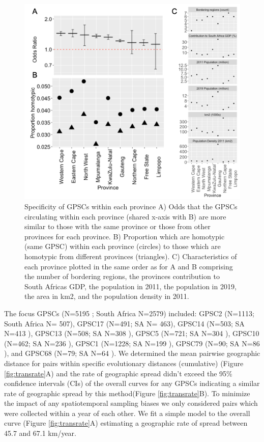 \documentclass{article}
\begin{document}
\begin{figure}[H]
\centering
    \includegraphics[width=\textwidth]{withinvsbetween.png}
    \caption{Specificity of GPSCs within each province A) Odds that the GPSCs circulating within each province (shared x-axis with B) are more similar to those with the same province or those from other provinces for each province. B) Proportion which are homotypic (same GPSC) within each province (circles) to those which are homotypic from different provinces (triangles). C) Characteristics of each province plotted in the same order as for A and B comprising the number of bordering regions, the provinces contribution to South Africas GDP, the population in 2011, the population in 2019, the area in km2, and the population density in 2011.}
      \label{fig:withinbetween}
\end{figure}
The focus GPSCs  (N=5195 ; South Africa N=2579) included: GPSC2 (N=1113; South Africa N= 507), GPSC17 (N=491; SA N= 463), GPSC14 (N=503; SA N=413 ), GPSC13 (N=508; SA N=308 ), GPSC5 (N=721; SA N=304 ), GPSC10 (N=462; SA N=236 ), GPSC1 (N=1228; SA N=199 ), GPSC79 (N=90; SA N=86 ),  and GPSC68 (N=79; SA N=64 ). We determined the mean pairwise geographic distance for pairs within specific evolutionary distances (cumulative) (Figure \ref{fig:transrate}A) and the rate of geographic spread didn't exceed the 95\% confidence intervals (CIs) of the overall curves for any GPSCs indicating a similar rate of geographic spread by this method(Figure \ref{fig:transrate}B). To minimize the impact of any spatiotemporal sampling biases we only considered pairs which were collected within a year of each other. We fit a simple model to the overall curve (Figure \ref{fig:transrate}A) estimating a geographic rate of spread between 45.7 and 67.1 km/year. 
\end{document}
